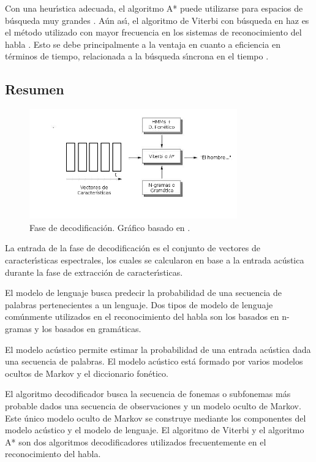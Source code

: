 Con una heur{\'\i}stica adecuada, el algoritmo A* puede utilizarse para espacios de b\'usqueda 
muy grandes \cite{huang-handbook10}.
A\'un as{\'\i}, el algoritmo de Viterbi con b\'usqueda en haz es el m\'etodo utilizado con mayor frecuencia
en los sistemas de reconocimiento del habla \cite{huang-handbook10}. 
Esto se debe principalmente a la ventaja en cuanto a eficiencia en t\'erminos de tiempo, 
relacionada a la b\'usqueda s{\'\i}ncrona en el tiempo \cite{huang-handbook10}.


\subsection{Resumen}

\begin{figure}[H] 
\centering
\includegraphics[width=0.8\textwidth]{./graphics/decodificacion.png}
\caption{Fase de decodificaci\'on. Gr\'afico basado en \cite{VerenichASR}.}
\label{figure:hmm}
\end{figure}

La entrada de la fase de decodificaci\'on es el conjunto de vectores de caracter{\'\i}sticas espectrales,
los cuales se calcularon en base a la entrada ac\'ustica durante la fase de extracci\'on de caracter{\'\i}sticas.

El modelo de lenguaje busca predecir la probabilidad de una secuencia de palabras pertenecientes a un lenguaje.
Dos tipos de modelo de lenguaje com\'unmente utilizados en el reconocimiento del habla son los basados en
n-gramas y los basados en gram\'aticas.

El modelo ac\'ustico permite estimar la probabilidad de una entrada ac\'ustica dada una secuencia de palabras.
El modelo ac\'ustico est\'a formado por varios modelos ocultos de Markov y el diccionario fon\'etico.

El algoritmo decodificador busca la secuencia de fonemas o subfonemas m\'as probable dados una 
secuencia de observaciones y un modelo oculto de Markov. Este \'unico modelo oculto de Markov se construye
mediante los componentes del modelo ac\'ustico y el modelo de lenguaje. El algoritmo de Viterbi y el 
algoritmo A* son dos algoritmos decodificadores utilizados frecuentemente en el reconocimiento del habla.

